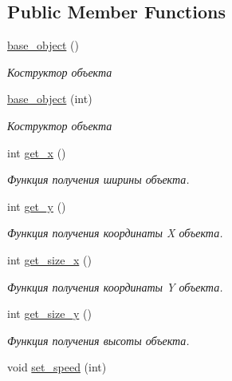 \subsection*{Public Member Functions}
\begin{DoxyCompactItemize}
\item 
\mbox{\label{classbase__object_a6c3928ac6aaf6b645c18ea8b7717dbd6}} 
\mbox{\hyperlink{classbase__object_a6c3928ac6aaf6b645c18ea8b7717dbd6}{base\+\_\+object}} ()
\begin{DoxyCompactList}\small\item\em Коструктор объекта \end{DoxyCompactList}\item 
\mbox{\hyperlink{classbase__object_aae443eac7c3fe83ea76ce4006359aaa7}{base\+\_\+object}} (int)
\begin{DoxyCompactList}\small\item\em Коструктор объекта \end{DoxyCompactList}\item 
int \mbox{\hyperlink{classbase__object_a53e9ce3dd05e9de706e05a5ec9df8d1e}{get\+\_\+x}} ()
\begin{DoxyCompactList}\small\item\em Функция получения ширины объекта. \end{DoxyCompactList}\item 
int \mbox{\hyperlink{classbase__object_ad1ff677f0809e24496f87c27ea2c65ec}{get\+\_\+y}} ()
\begin{DoxyCompactList}\small\item\em Функция получения координаты X объекта. \end{DoxyCompactList}\item 
int \mbox{\hyperlink{classbase__object_a9b018abfe21170353c163cad9511f02c}{get\+\_\+size\+\_\+x}} ()
\begin{DoxyCompactList}\small\item\em Функция получения координаты Y объекта. \end{DoxyCompactList}\item 
int \mbox{\hyperlink{classbase__object_a58391e1cc3093e8b6ee1aaeadd8335d5}{get\+\_\+size\+\_\+y}} ()
\begin{DoxyCompactList}\small\item\em Функция получения высоты объекта. \end{DoxyCompactList}\item 
void \mbox{\hyperlink{classbase__object_a6aa28faa9734744b5992da58121e6095}{set\+\_\+speed}} (int)

\end{DoxyCompactItemize}
